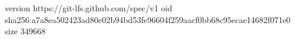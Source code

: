 version https://git-lfs.github.com/spec/v1
oid sha256:a7a8ea502423ad80e02b94bd53fe96604f259aacf0bb68c95ecae14682f071e0
size 349668
